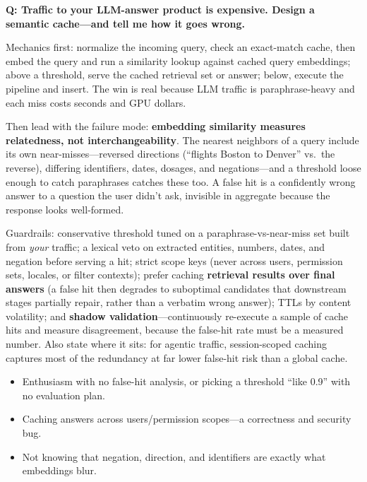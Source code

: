 \begin{interviewq}
\textbf{Q: Traffic to your LLM-answer product is expensive. Design a semantic cache---and tell me how it goes wrong.}

 \quad {} \quad \badgefreq{\freqmed}

\stronganswer

Mechanics first: normalize the incoming query, check an exact-match cache, then embed the query and run a similarity lookup against cached query embeddings; above a threshold, serve the cached retrieval set or answer; below, execute the pipeline and insert. The win is real because LLM traffic is paraphrase-heavy and each miss costs seconds and GPU dollars.

Then lead with the failure mode: \textbf{embedding similarity measures relatedness, not interchangeability}. The nearest neighbors of a query include its own near-misses---reversed directions (``flights Boston to Denver'' vs.\ the reverse), differing identifiers, dates, dosages, and negations---and a threshold loose enough to catch paraphrases catches these too. A false hit is a confidently wrong answer to a question the user didn't ask, invisible in aggregate because the response looks well-formed.

Guardrails: conservative threshold tuned on a paraphrase-vs-near-miss set built from \textit{your} traffic; a lexical veto on extracted entities, numbers, dates, and negation before serving a hit; strict scope keys (never across users, permission sets, locales, or filter contexts); prefer caching \textbf{retrieval results over final answers} (a false hit then degrades to suboptimal candidates that downstream stages partially repair, rather than a verbatim wrong answer); TTLs by content volatility; and \textbf{shadow validation}---continuously re-execute a sample of cache hits and measure disagreement, because the false-hit rate must be a measured number. Also state where it sits: for agentic traffic, session-scoped caching captures most of the redundancy at far lower false-hit risk than a global cache.

\redflags
\begin{itemize}
    \item Enthusiasm with no false-hit analysis, or picking a threshold ``like 0.9'' with no evaluation plan.
    \item Caching answers across users/permission scopes---a correctness and security bug.
    \item Not knowing that negation, direction, and identifiers are exactly what embeddings blur.
\end{itemize}


\end{interviewq}
